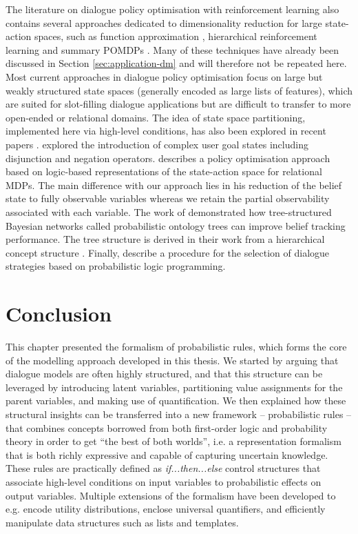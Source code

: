 The literature on dialogue policy optimisation with reinforcement learning also contains several approaches dedicated to dimensionality reduction for large state-action spaces, such as function approximation \citep{Henderson:2008}, hierarchical reinforcement learning \citep{Cuayahuitl:2010} and summary POMDPs \citep{Young:2010}.  Many of these techniques have already been discussed in Section \ref{sec:application-dm} and will therefore not be repeated here. Most current approaches in dialogue policy optimisation focus on large but weakly structured state spaces (generally encoded as large lists of features), which are suited for slot-filling dialogue applications but are difficult to transfer to more open-ended or relational domains.  The idea of state space partitioning, implemented here via high-level conditions, has also been explored in recent papers \citep[see e.g. ][]{Williams2010}. \cite{Crook:2010} explored the introduction of complex user goal states including disjunction and negation operators. \cite{Heriberto2011} describes a policy optimisation approach based on logic-based representations of the state-action space for relational MDPs. The main difference with our approach lies in his reduction of the belief state to fully observable variables whereas we retain the partial observability associated with each variable.  The work of \cite{Mehta:2010,Raux2011} demonstrated how tree-structured Bayesian networks called probabilistic ontology trees can improve belief tracking performance.  The tree structure is derived in their work from a hierarchical concept structure .  Finally, \cite{neill2011} describe a procedure for the selection of dialogue strategies based on probabilistic logic programming. 

\section{Conclusion}

This chapter presented the formalism of probabilistic rules, which forms the core of the modelling approach developed in this thesis. We started by arguing that dialogue models are often highly structured, and that this structure can be leveraged by introducing latent variables, partitioning value assignments for the parent variables, and making use of quantification. We then explained how these structural insights can be transferred into a new framework -- probabilistic rules -- that combines concepts borrowed from both first-order logic and probability theory in order to get ``the best of both worlds'', i.e. a representation formalism that is both richly expressive and capable of capturing uncertain knowledge.  These rules are practically defined as \textit{if...then...else} control structures that associate high-level conditions on input variables to probabilistic effects on output variables.  Multiple extensions of the formalism have been developed to e.g. encode utility distributions, enclose universal quantifiers, and efficiently manipulate data structures such as lists and templates. 

